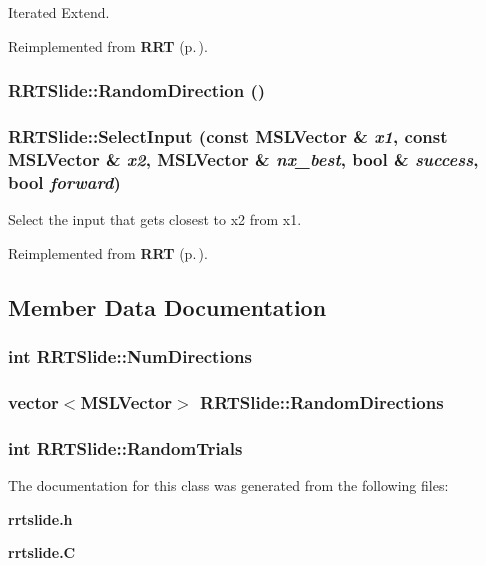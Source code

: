 Iterated Extend.



Reimplemented from {\bf RRT} {\rm (p.\,\pageref{classRRT_b3})}.
\subsubsection{ RRTSlide::Random\-Direction ()}\label{classRRTSlide_a4}


\subsubsection{ RRTSlide::Select\-Input (const {\bf MSLVector} \& {\em x1}, const {\bf MSLVector} \& {\em x2}, {\bf MSLVector} \& {\em nx\_\-best}, bool \& {\em success}, bool {\em forward})\hspace{0.3cm}{\tt  [virtual]}}\label{classRRTSlide_a2}


Select the input that gets closest to x2 from x1.



Reimplemented from {\bf RRT} {\rm (p.\,\pageref{classRRT_b0})}.

\subsection{Member Data Documentation}
\subsubsection{\setlength{\rightskip}{0pt plus 5cm}int RRTSlide::Num\-Directions}\label{classRRTSlide_m1}


\subsubsection{\setlength{\rightskip}{0pt plus 5cm}vector$<${\bf MSLVector}$>$ RRTSlide::Random\-Directions}\label{classRRTSlide_m2}


\subsubsection{\setlength{\rightskip}{0pt plus 5cm}int RRTSlide::Random\-Trials}\label{classRRTSlide_m0}




The documentation for this class was generated from the following files:\begin{CompactItemize}
\item 
{\bf rrtslide.h}\item 
{\bf rrtslide.C}\end{CompactItemize}
